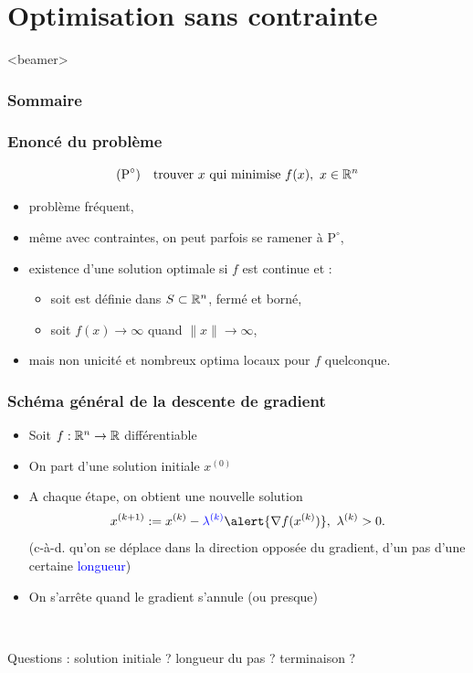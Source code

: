 \documentclass{beamer}
\newcommand{\R}{{\ensuremath\mathbb{R}}}
\begin{document}
\section{Optimisation sans contrainte}

\begin{frame}<beamer>
  \frametitle{Sommaire}
  \tableofcontents[currentsection]
\end{frame}

\begin{frame}
  \frametitle{Enoncé du problème}

  \[
  (\text{P}^\circ) \quad
    \text{trouver} \ x \ \text{qui minimise} \ f(x), \ x \in \R^n
  \]

  \begin{itemize}
  \item problème fréquent,
  \item même avec contraintes, on peut parfois se ramener à $\text{P}^\circ$,
  \item existence d'une solution optimale si $f$ est continue et :
    \begin{itemize}
    \item soit est définie dans $S \subset \R^n$, fermé et borné,
    \item soit $f(x) \rightarrow \infty$ quand $\|x\| \rightarrow \infty$, 
    \end{itemize}
  \item mais non unicité et nombreux optima locaux pour $f$ quelconque.
  \end{itemize}
  
\end{frame}

\begin{frame}
  \frametitle{Schéma général de la descente de gradient}

  \begin{itemize}
  \item Soit $f : \R^n \rightarrow \R$ différentiable
  \item On part d'une solution initiale $x^{(0)}$
  \item A chaque étape, on obtient une nouvelle solution
    \[ x^{(k+1)} := x^{(k)} - \textcolor{blue}{\lambda^{(k)}} \alert{{\nabla f}(x^{(k)})}, \ \lambda^{(k)} > 0. \]
    (c-à-d. qu'on se déplace dans la direction opposée du \alert{gradient},
    d'un pas d'une certaine \textcolor{blue}{longueur})
  \item On s'arrête quand le gradient s'annule (ou presque)
  \end{itemize}

  ~

  Questions : 
  solution initiale ?
  longueur du pas ?
  terminaison ?
\end{frame}
\end{document}
